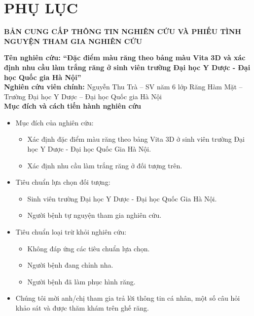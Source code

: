 \chapter*{PHỤ LỤC}
\newpage
\begin{center}
    \textbf{BẢN CUNG CẤP THÔNG TIN NGHIÊN CỨU VÀ PHIẾU TÌNH NGUYỆN THAM GIA NGHIÊN CỨU}\par
\end{center}

\noindent
\textbf{Tên nghiên cứu: “Đặc điểm màu răng theo bảng màu Vita 3D và xác định nhu cầu làm trắng răng ở sinh viên trường Đại học Y Dược - Đại học Quốc gia Hà Nội”}\\
\vspace{3pt}
\textbf{Nghiên cứu viên chính:} Nguyễn Thu Trà – SV năm 6 lớp Răng Hàm Mặt – Trường Đại học Y Dược – Đại học Quốc gia Hà Nội\\
\vspace{3pt}
\noindent
\textbf{Mục đích và cách tiến hành nghiên cứu}
\begin{itemize}
\setlength{\itemsep}{0pt}
    \item Mục đích của nghiên cứu:
    \begin{itemize}
    \setlength{\itemsep}{0pt}
        \item Xác định đặc điểm màu răng theo bảng Vita 3D ở sinh viên trường Đại học Y Dược - Đại học Quốc Gia Hà Nội.
        \item Xác định nhu cầu làm trắng răng ở đối tượng trên.
    \end{itemize}
    \item Tiêu chuẩn lựa chọn đối tượng:
    \begin{itemize}
    \setlength{\itemsep}{0pt}
        \item Sinh viên trường Đại học Y Dược - Đại học Quốc Gia Hà Nội.
        \item Người bệnh tự nguyện tham gia nghiên cứu.
    \end{itemize}
    \item Tiêu chuẩn loại trừ khỏi nghiên cứu:
    \begin{itemize}
    \setlength{\itemsep}{0pt}
        \item Không đáp ứng các tiêu chuẩn lựa chọn.
        \item Người bệnh đang chỉnh nha.
        \item Người bệnh đã làm phục hình răng.
    \end{itemize}
    \item Chúng tôi mời anh/chị tham gia trả lời thông tin cá nhân, một số câu hỏi khảo sát và được thăm khám trên ghế răng.
\end{itemize}

